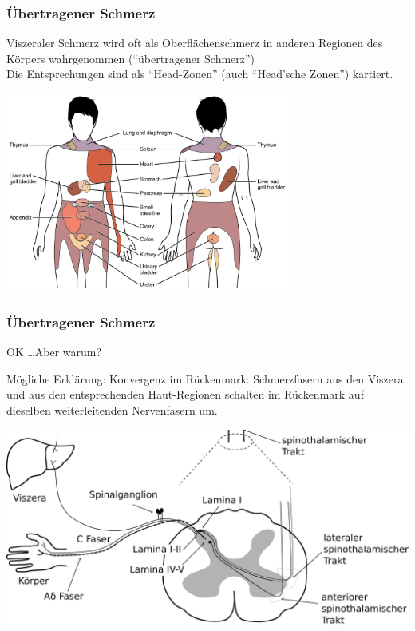 \documentclass{beamer}
\begin{document}
\begin{frame}
\frametitle{Übertragener Schmerz}

Viszeraler Schmerz wird oft als Oberflächenschmerz in anderen Regionen des Körpers wahrgenommen (``übertragener Schmerz'') \\
Die Entsprechungen sind als ``Head-Zonen'' (auch ``Head'sche Zonen'') kartiert.


\begin{center}
\includegraphics[width=0.7\textwidth]{Referred_Pain_Chart.jpg}
\end{center}

\end{frame}

\begin{frame}
\frametitle{Übertragener Schmerz}

OK \dots Aber warum? 


\pause

Mögliche Erklärung: Konvergenz im Rückenmark: Schmerzfasern aus den Viszera und aus den entsprechenden Haut-Regionen schalten im Rückenmark auf dieselben weiterleitenden Nervenfasern um. \\


\begin{center}
\includegraphics[width=\textwidth]{Schmerz_aufsteigend_bis_Rueckenmark.png}
\end{center}



\end{frame}
\end{document}
